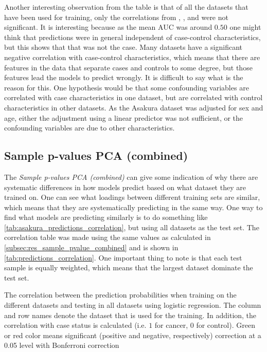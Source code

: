 {{{{{{{{{{{{{{{Another interesting observation from the table is that of all the datasets that have been used for training, only the correlations from \citet{Boeri2011}, \citet{Jin2017}, \citet{Keller2020} and \citet{Patnaik2012} were not significant. It is interesting because as the mean AUC was around $0.50$ one might think that predictions were in general independent of case-control characteristics, but this shows that that was not the case. Many datasets have a significant negative correlation with case-control characteristics, which means that there are features in the data that separate cases and controls to some degree, but those features lead the models to predict wrongly. It is difficult to say what is the reason for this. One hypothesis would be that some confounding variables are correlated with case characteristics in one dataset, but are correlated with control characteristics in other datasets. As the Asakura dataset was adjusted for sex and age, either the adjustment using a linear predictor was not sufficient, or the confounding variables are due to other characteristics.

\iffalse
\subsection{Sample p-values PCA (combined)}

The \textit{Sample p-values PCA (combined)} can give some indication of why there are systematic differences in how models predict based on what dataset they are trained on. One can see what loadings between different training sets are similar, which means that they are systematically predicting in the same way. One way to find what models are predicting similarly is to do something like \autoref{tab:asakura_predictions_correlation}, but using all datasets as the test set. The correlation table was made using the same values as calculated in \autoref{subsec:res_sample_pvalue_combined} and is shown in \autoref{tab:predictions_correlation}. One important thing to note is that each test sample is equally weighted, which means that the largest dataset dominate the test set.


\begin{table}
    \caption{The correlation between the prediction probabilities when training on the different datasets and testing in all datasets using logistic regression. The column and row names denote the dataset that is used for the training. In addition, the correlation with case status is calculated (i.e. $1$ for cancer, $0$ for control). Green or red color means significant (positive and negative, respectively) correction at a 0.05 level with Bonferroni correction}
    \label{tab:predictions_correlation}
\begin{pycode}


\end{pycode}
\end{table}}}}}}}}}}}}}}}}
